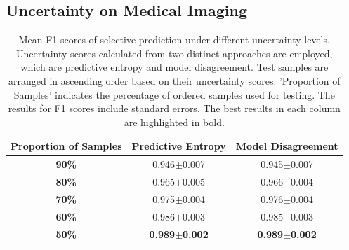 \documentclass[10pt]{article} %
\begin{document}
\subsection{Uncertainty on Medical Imaging}
\begin{table}[!htp]
\caption{Mean F1-scores of selective prediction under different uncertainty levels. Uncertainty scores calculated from two distinct approaches are employed, which are predictive entropy and model disagreement. Test samples are arranged in ascending order based on their uncertainty scores. 'Proportion of Samples' indicates the percentage of ordered samples used for testing. The results for F1 scores include standard errors. The best results in each column are highlighted in bold.}
\label{table: VIFA_uncertainty_f1_score}
\begin{center}
\begin{tabular}{c|c|c}
\textbf{Proportion of Samples} & \textbf{Predictive Entropy} & \textbf{Model Disagreement} \\ \hline
\textbf{90\%}                               & 0.946$\pm$0.007                 & 0.945$\pm$0.007                 \\
\textbf{80\%}                               & 0.965$\pm$0.005                 & 0.966$\pm$0.004                 \\
\textbf{70\%}                               & 0.975$\pm$0.004                 & 0.976$\pm$0.004                 \\
\textbf{60\%}                               & 0.986$\pm$0.003                 & 0.985$\pm$0.003                 \\
\textbf{50\%}                               & \textbf{0.989$\pm$0.002}                 & \textbf{0.989$\pm$0.002}                
\end{tabular}
\end{center}
\end{table}
\end{document}
